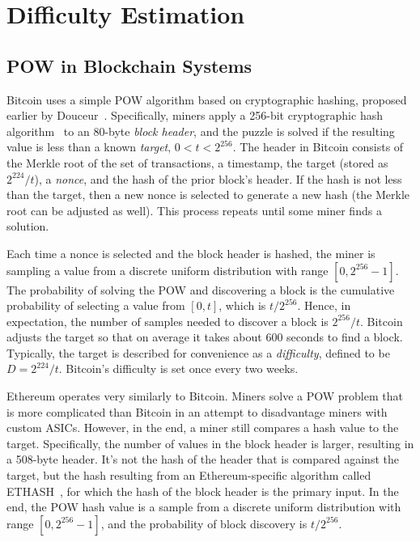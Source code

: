 \chapter{Difficulty Estimation}
\label{difficulty-estimation}

\section{POW in Blockchain Systems}
Bitcoin uses a simple POW algorithm based on cryptographic
hashing, proposed earlier by Douceur~\cite{Douceur:2002}.
Specifically, miners apply a 256-bit cryptographic hash algorithm~\cite{hashcash} to
an 80-byte {\em block header}, and the puzzle is solved if the
resulting value is less than a known {\em target}, $0<t<2^{256}$. The
header in Bitcoin consists of the Merkle root of the set of
transactions, a timestamp, the target (stored as $2^{224}/t$), a {\em
  nonce}, and the hash of the prior block's header. If the hash is not
less than the target, then a new nonce is selected to generate a new
hash (the Merkle root can be adjusted as well). This process repeats
until some miner finds a solution.
  
Each time a nonce is selected and the block
header is hashed, the miner is sampling a value from a discrete uniform
distribution with range $[0,2^{256}-1]$. The probability of solving the POW and
discovering a block is the cumulative probability of selecting a value
from $[0,t]$, which is $t/{2^{256}}$. Hence, in expectation, the
number of samples needed to discover a block is ${2^{256}/t}$. Bitcoin
adjusts the target so that on average it takes about 600 seconds to
find a block. Typically, the target is described for convenience as a
{\em difficulty}, defined to be $D=2^{224}/t$. Bitcoin's difficulty
is set once every two weeks.

 Ethereum operates very similarly to Bitcoin. Miners solve a POW problem that is more complicated
than Bitcoin in an attempt to disadvantage miners with custom ASICs.
However, in the end, a miner still compares a hash value to the target.
Specifically, the number of values in the block header is larger,
resulting in a 508-byte header. It's not the hash of the header that
is compared against the target, but the hash resulting from an
Ethereum-specific algorithm called ETHASH~\cite{ETHASH}, for which the
hash of the block header is the primary input. In the end, the POW
hash value is a sample from a discrete uniform distribution with range
$[0,2^{256}-1]$, and the probability of block discovery is
${t/2^{256}}$.

